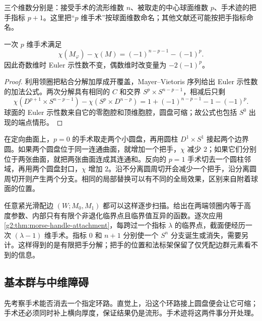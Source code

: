 三个维数分别是：接受手术的流形维数 \(n\)、被取走的中心球面维数 \(p\)、手术迹的把手指标 \(p+1\)。这里把“\(p\) 维手术”按球面维数命名；其他文献还可能按把手指标命名。

\begin{proposition}\label{g2:prop:surgery-euler}
	一次 \(p\) 维手术满足
	\[
		\chi(M_\varphi)-\chi(M)=(-1)^{n-p-1}-(-1)^p.
	\]
	因此奇数维时 Euler 示性数不变，偶数维时改变量为 \(-2(-1)^p\)。
\end{proposition}
\begin{proof}
	利用领圈把粘合分解加厚成开覆盖，Mayer--Vietoris 序列给出 Euler 示性数的加法公式。两次分解具有相同的 \(C\) 和交界 \(S^p\times S^{n-p-1}\)，相减后只剩
	\[
		\chi(D^{p+1}\times S^{n-p-1})-\chi(S^p\times D^{n-p})
		=1+(-1)^{n-p-1}-1-(-1)^p.
	\]
	球面的 Euler 示性数来自它的零胞腔和顶维胞腔，圆盘可缩；故公式也包括 \(S^0\) 出现的端点情形。
\end{proof}

\begin{example}\label{g2:exm:surface-surgery}
	在定向曲面上，\(p=0\) 的手术取走两个小圆盘，再用圆柱 \(D^1\times S^1\) 接起两个边界圆。如果两个圆盘位于同一连通曲面，就增加一个把手，\(\chi\) 减少 \(2\)；如果它们分别位于两张曲面，就把两张曲面连成其连通和。反向的 \(p=1\) 手术切去一个圆柱邻域，再用两个圆盘封口，\(\chi\) 增加 \(2\)。沿不分离圆周切开会减少一个把手，沿分离圆周切开则产生两个分支。相同的局部替换可以有不同的全局效果，区别来自附着球面的位置。
\end{example}

任意紧光滑配边 \((W;M_0,M_1)\) 都可以这样逐步扫描。给出在两端领圈内等于高度参数、内部只有有限个非退化临界点且临界值互异的函数。逐次应用\cref{g2:thm:morse-handle-attachment}，每跨过一个指标 \(\lambda\) 的临界点，截面便经历一次 \((\lambda-1)\) 维手术。指标 \(0\) 和 \(n+1\) 分别使一个 \(S^n\) 分支诞生或消失，需要另计。这样得到的是有限把手分解；把手的位置和法标架保留了仅凭配边群元素看不到的信息。

\subsection{基本群与中维障碍}
\label{g2:subsec:2303:02}
先考察手术能否消去一个指定环路。直觉上，沿这个环路接上圆盘便会让它可缩；手术还必须同时补上横向厚度，保证结果仍是流形。手术迹将这两件事分开处理。

